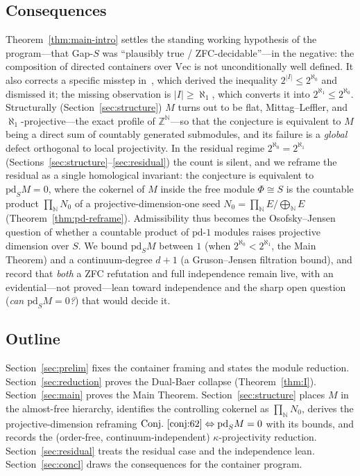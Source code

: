 \documentclass[11pt,reqno]{amsart}
\theoremstyle{plain}
\theoremstyle{definition}
\theoremstyle{remark}
\renewcommand{\Vec}{\mathrm{Vec}}
\newcommand{\pd}{\mathrm{pd}}
\newcommand{\N}{\mathbb{N}}
\newcommand{\Z}{\mathbb{Z}}
\begin{document}
\subsection*{Consequences}
Theorem~\ref{thm:main-intro} settles the standing working hypothesis of the program---that Gap-$S$ was ``plausibly true / ZFC-decidable''---in the negative: the composition of directed containers over $\Vec$ is not unconditionally well defined. It also corrects a specific misstep in~\cite{macbeth-reduction}, which derived the inequality $2^{|I|}\le 2^{\aleph_0}$ and dismissed it; the missing observation is $|I|\ge\aleph_1$, which converts it into $2^{\aleph_1}\le 2^{\aleph_0}$. Structurally (Section~\ref{sec:structure}) $M$ turns out to be flat, Mittag--Leffler, and $\aleph_1$-projective---the exact profile of $\Z^{\N}$---so that the conjecture is equivalent to $M$ being a direct sum of countably generated submodules, and its failure is a \emph{global} defect orthogonal to local projectivity. In the residual regime $2^{\aleph_0}=2^{\aleph_1}$ (Sections~\ref{sec:structure}--\ref{sec:residual}) the count is silent, and we reframe the residual as a single homological invariant: the conjecture is equivalent to $\pd_S M=0$, where the cokernel of $M$ inside the free module $\Phi\cong S$ is the countable product $\prod_{\N}N_0$ of a projective-dimension-one seed $N_0=\prod_{\N}E/\bigoplus_{\N}E$ (Theorem~\ref{thm:pd-reframe}). Admissibility thus becomes the Osofsky--Jensen question of whether a countable product of $\pd$-$1$ modules raises projective dimension over $S$. We bound $\pd_S M$ between $1$ (when $2^{\aleph_0}<2^{\aleph_1}$, the Main Theorem) and a continuum-degree $d+1$ (a Gruson--Jensen filtration bound), and record that \emph{both} a ZFC refutation and full independence remain live, with an evidential---not proved---lean toward independence and the sharp open question (\emph{can $\pd_S M=0$?}) that would decide it.

\subsection*{Outline}
Section~\ref{sec:prelim} fixes the container framing and states the module reduction. Section~\ref{sec:reduction} proves the Dual-Baer collapse (Theorem~\ref{thm:I}). Section~\ref{sec:main} proves the Main Theorem. Section~\ref{sec:structure} places $M$ in the almost-free hierarchy, identifies the controlling cokernel as $\prod_{\N}N_0$, derives the projective-dimension reframing $\text{Conj.\ \ref{conj:62}}\Leftrightarrow\pd_S M=0$ with its bounds, and records the (order-free, continuum-independent) $\kappa$-projectivity reduction. Section~\ref{sec:residual} treats the residual case and the independence lean. Section~\ref{sec:concl} draws the consequences for the container program.
\end{document}
